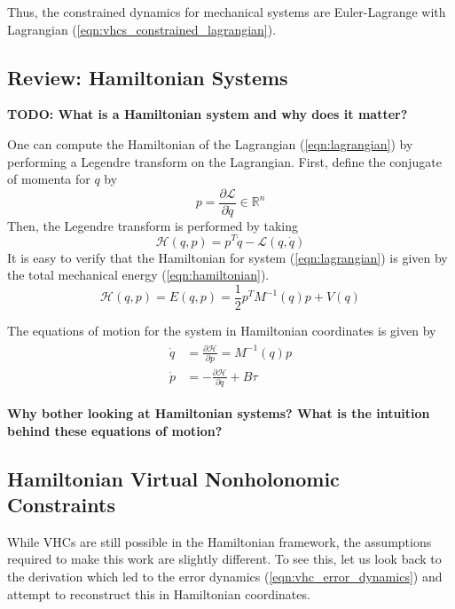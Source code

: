 Thus, the constrained dynamics for mechanical systems are Euler-Lagrange with
Lagrangian (\ref{eqn:vhcs_constrained_lagrangian}).


\subsection{Review: Hamiltonian Systems}
\textbf{TODO: What is a Hamiltonian system and why does it matter?}

One can compute the Hamiltonian of the Lagrangian (\ref{eqn:lagrangian}) by 
performing a Legendre transform on the Lagrangian. 
First, define the conjugate of momenta for \(q\) by 
\begin{equation*}
p = \frac{\partial \mathcal{L}}{\partial \dot{q}} \in \mathbb{R}^n
\end{equation*}
Then, the Legendre transform is performed by taking
\begin{equation*}
\mathcal{H}(q,p) = p^T \dot{q} - \mathcal{L}(q,\dot{q})
\end{equation*}
It is easy to verify that the Hamiltonian for system (\ref{eqn:lagrangian}) is 
given by the total mechanical energy (\ref{eqn:hamiltonian}).
\begin{equation}\label{eqn:hamiltonian}
\mathcal{H}(q,p) = E(q,p) = \frac{1}{2} p^T M^{-1}(q) p + V(q)
\end{equation}

The equations of motion for the system in Hamiltonian coordinates is given by
\begin{align}\label{eqn:hamiltionian_eom}
\begin{split}
\dot{q} &= \frac{\partial \mathcal{H}}{\partial p} = M^{-1}(q) p \\
\dot{p} &= -\frac{\partial \mathcal{H}}{\partial q} + B \tau
\end{split}
\end{align}

\textbf{Why bother looking at Hamiltonian systems? What is the intuition behind
these equations of motion?}

\subsection{Hamiltonian Virtual Nonholonomic Constraints}
While VHCs are still possible in the Hamiltonian framework, the assumptions
required to make this work are slightly different. To see this, let us look back
to the derivation which led to the error dynamics (\ref{eqn:vhc_error_dynamics})
and attempt to reconstruct this in Hamiltonian coordinates.

